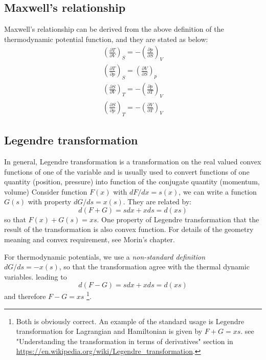 \documentclass{article}
\newcommand{\pfrac}[2]{\frac{\partial #1}{\partial #2}}
\begin{document}
\subsection{Maxwell's relationship}
Maxwell's relationship can be derived from the above  definition of the thermodynamic
potential function, and they are stated as below:
\begin{gather}
    \left(\pfrac{T}{V}\right)_S = - \left(\pfrac{p}{S}\right)_V \\
    \left(\pfrac{T}{p}\right)_S = \left(\pfrac{V}{S}\right)_p \\
    \left(\pfrac{S}{V}\right)_T = - \left(\pfrac{p}{T}\right)_V \\
    \left(\pfrac{S}{p}\right)_T = - \left(\pfrac{V}{T}\right)_V 
\end{gather}

\subsection{Legendre transformation}
In general, Legendre transformation is a transformation on the real valued convex functions
of one of the variable and is usually used to convert functions of one quantity (position, pressure) into function of
the conjugate quantity (momentum, volume)
Consider function $F(x)$ with $dF/dx = s(x)$, we can write a function
$G(s)$ with property $dG/ds = x(s)$. They are related by:
\begin{equation}
    d(F+G) = sdx + xds = d(xs)
\end{equation}
so that $F(x) + G(s) = xs$. One property of Legendre transformation that the result of the transformation 
is also convex function. For details of the geometry meaning and convex requirement, see Morin's chapter.

For thermodynamic potentials, we use a \emph{non-standard definition} $dG/ds = -x(s)$, 
so that the transformation agree with the thermal dynamic variables.
leading to 
\begin{equation}
    d(F-G) = sdx + xds = d(xs)
\end{equation}
and therefore $F-G = xs$
\footnote{
    Both is obviously correct. An example of the standard usage is Legendre transformation 
    for Lagrangian and Hamiltonian is given by $F+G = xs$. see "Understanding the transformation in terms of derivatives"
    section in \url{https://en.wikipedia.org/wiki/Legendre_transformation}.
}.
\end{document}
